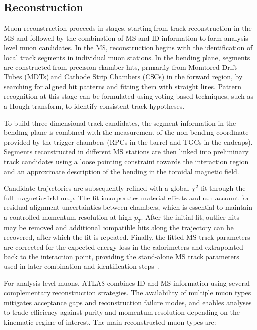\subsection{Reconstruction}

Muon reconstruction proceeds in stages, starting from track reconstruction in the
MS and followed by the combination of MS and ID information to form analysis-level
muon candidates.
In the MS, reconstruction begins with the identification of local track segments
in individual muon stations.
In the bending plane, segments are constructed from precision chamber hits,
primarily from Monitored Drift Tubes (MDTs) and Cathode Strip Chambers (CSCs) in
the forward region, by searching for aligned hit patterns and fitting them with
straight lines.
Pattern recognition at this stage can be formulated using voting-based techniques,
such as a Hough transform, to identify consistent track hypotheses.

To build three-dimensional track candidates, the segment information in the
bending plane is combined with the measurement of the non-bending coordinate
provided by the trigger chambers (RPCs in the barrel and TGCs in the endcaps).
Segments reconstructed in different MS stations are then linked into preliminary
track candidates using a loose pointing constraint towards the interaction
region and an approximate description of the bending in the toroidal magnetic
field.

Candidate trajectories are subsequently refined with a global $\chi^2$ fit
through the full magnetic-field map.
The fit incorporates material effects and can account for residual alignment
uncertainties between chambers, which is essential to maintain a controlled
momentum resolution at high $p_T$.
After the initial fit, outlier hits may be removed and additional compatible hits
along the trajectory can be recovered, after which the fit is repeated.
Finally, the fitted MS track parameters are corrected for the expected energy loss
in the calorimeters and extrapolated back to the interaction point, providing the
stand-alone MS track parameters used in later combination and identification
steps~\cite{ATLASMuonReco2021}.

For analysis-level muons, ATLAS combines ID and MS information using several
complementary reconstruction strategies.
The availability of multiple muon types mitigates acceptance gaps and
reconstruction failure modes, and enables analyses to trade efficiency against
purity and momentum resolution depending on the kinematic regime of interest.
The main reconstructed muon types are:

